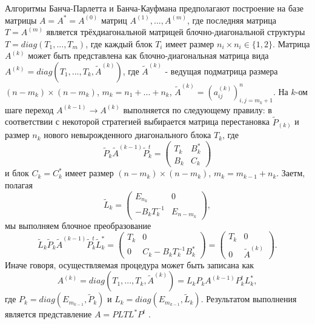 \documentclass[a4paper, 12pt]{article}   	%
\begin{document}
Алгоритмы Банча-Парлетта и Банча-Кауфмана предполагают построение на базе матрицы $A = A^* = A^{(0)}$ матриц $A^{(1)},...,A^{(m)}$, где последняя матрица $T = A^{(m)}$ является трёхдиагональной матрицей блочно-диагональной структуры $T = diag(T_1,...,T_m)$, где каждый блок $T_i$ имеет размер $n_i \times n_i \in  \{1, 2\}$. Матрица $A^{(k)}$ может быть представлена как блочно-диагональная матрица вида $A^{(k)} = diag(T_1,...,T_k, \widetilde{A}^{(k)})$, где $\widetilde{A}^{(k)}$ - ведущая подматрица размера $(n-m_k) \times (n-m_k)$, $m_k = n_1 + ... + n_k$, $\widetilde{A}^{(k)} = (a_{ij}^{(k)})_{i,j = m_k +1}^{n}$. На $k$-ом шаге переход $A^{(k-1)} \rightarrow A^{(k)}$ выполняется по следующему правилу: в соответствии с некоторой стратегией выбирается матрица перестановка $\widetilde{P}_{(k)}$ и размер $n_k$ нового невырожденного диагонального блока $T_k$, где 
\begin{equation*}\label{part1}
 \widetilde{P}_k \widetilde{A}^{(k-1)} \widetilde{P}_k^t =
 \left(\begin{array}{cc} 
T_k & B_k^* \\ 
B_k & C_k  
\end{array}\right)
\end{equation*}
и блок $C_k = C_k^*$ имеет размер $(n-m_k) \times (n-m_k)$, $m_k = m_{k-1} + n_k$. Заетм, полагая 
\begin{equation*}\label{part2}
 \widetilde{L}_k =
 \left(\begin{array}{cc} 
E_{n_k} & 0 \\ 
-B_kT_k^{-1} & E_{n-m_k}  
\end{array}\right),
\end{equation*}
мы выполняем блочное преобразование
\begin{equation*}\label{part3}
 \widetilde{L}_k \widetilde{P}_k \widetilde{A}^{(k-1)} \widetilde{P}_k^t \widetilde{L}_k^* =
 \left(\begin{array}{cc} 
T_k & 0 \\ 
0 & C_k-B_k T_k^{-1} B_k^* 
\end{array}\right)
=
\left(\begin{array}{cc} 
T_k & 0 \\ 
0 &  \widetilde{A}^{(k)}
\end{array}\right).
\end{equation*}
Иначе говоря, осуществляемая процедура может быть записана как
\begin{equation*}\label{part4}
 A^{(k)} = diag(T_1,...,T_k, \widetilde{A}^{(k)}) = L_k P_k A^{(k-1)} P_k^t L_k^*,
\end{equation*}
где $P_k = diag(E_{m_{k-1}}, \widetilde{P}_k)$ и $L_k = diag(E_{m_{k-1}}, \widetilde{L}_k)$. Результатом выполнения является представление $A = PLTL^*P^t$ \cite{Golubkov}. 
\end{document}
